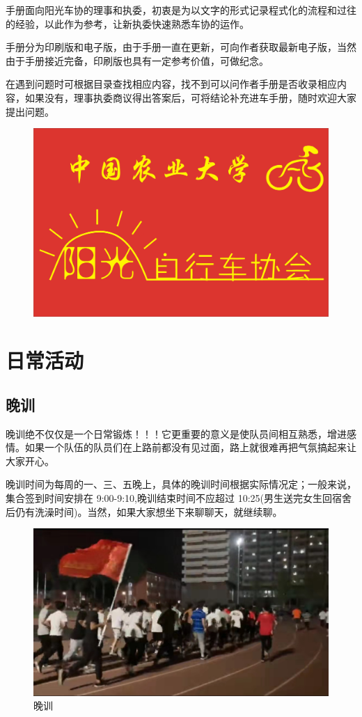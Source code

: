 \documentclass{ctexbook}
\begin{document}
手册面向阳光车协的理事和执委，初衷是为以文字的形式记录程式化的流程和过往的经验，以此作为参考，让新执委快速熟悉车协的运作。

手册分为印刷版和电子版，由于手册一直在更新，可向作者获取最新电子版，当然由于手册接近完备，印刷版也具有一定参考价值，可做纪念。

在遇到问题时可根据目录查找相应内容，找不到可以问作者手册是否收录相应内容，如果没有，理事执委商议得出答案后，可将结论补充进车手册，随时欢迎大家提出问题。
\begin{figure}[H]
\centering
  \includegraphics[width=1\linewidth]{fig/会旗.jpg}
\end{figure}

\tableofcontents
\newpage 
\setcounter{page}{1} 
\mainmatter
\chapter{日常活动}
\section{晚训}
\label{sec:晚训}

晚训绝不仅仅是一个日常锻炼！！！它更重要的意义是使队员间相互熟悉，增进感情。如果一个队伍的队员们在上路前都没有见过面，路上就很难再把气氛搞起来让大家开心。

晚训时间为每周的一、三、五晚上，具体的晚训时间根据实际情况定；一般来说，集合签到时间安排在 9:00-9:10,晚训结束时间不应超过 10:25(男生送完女生回宿舍后仍有洗澡时间)。当然，如果大家想坐下来聊聊天，就继续聊。
\begin{figure}[htp]
    \centering
    \includegraphics[width=1\linewidth]{fig/晚训}
    \caption{晚训}
\end{figure}
\end{document}
